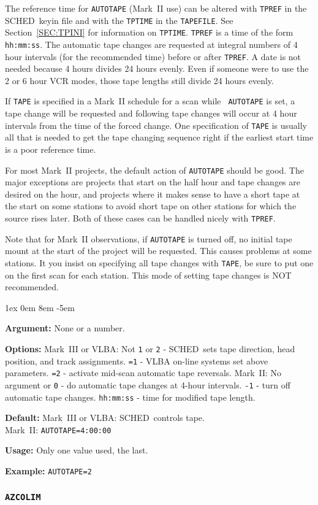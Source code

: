 \documentclass{report}
\newcommand{\schedb}{{\sc SCHED~}}
\newcommand{\rcwbox}[5]{
  \begin{list}{}{\parsep 1ex  \itemsep 0em
                 \leftmargin 8em  \itemindent -5em }
    \item {\bf Argument:} #1
    \item {\bf Options:}  #2
    \item {\bf Default:}  #3
    \item {\bf Usage:}    #4
    \item {\bf Example:}  #5
  \end{list}
}
\begin{document}
The reference time for {\tt AUTOTAPE} (Mark~II use) can be altered
with {\tt TPREF} in the \schedb keyin file and with the {\tt TPTIME}
in the {\tt TAPEFILE}. See Section~\ref{SEC:TPINI} for information on
{\tt TPTIME}. {\tt TPREF} is a time of the form {\tt hh:mm:ss}. The
automatic tape changes are requested at integral numbers of 4 hour
intervals (for the recommended time) before or after {\tt TPREF}. A
date is not needed because 4 hours divides 24 hours evenly. Even if
someone were to use the 2 or 6 hour VCR modes, those tape lengths
still divide 24 hours evenly.

If {\tt TAPE} is specified in a Mark~II schedule for a scan while {\tt
AUTOTAPE} is set, a tape change will be requested and following tape
changes will occur at 4 hour intervals from the time of the forced
change. One specification of {\tt TAPE} is usually all that is needed
to get the tape changing sequence right if the earliest start time is
a poor reference time.

For most Mark~II projects, the default action of {\tt AUTOTAPE} should
be good. The major exceptions are projects that start on the half hour
and tape changes are desired on the hour, and projects where it makes
sense to have a short tape at the start on some stations to avoid
short tape on other stations for which the source rises later. Both of
these cases can be handled nicely with {\tt TPREF}.

Note that for Mark~II observations, if {\tt AUTOTAPE} is turned off,
no initial tape mount at the start of the project will be requested.
This causes problems at some stations. It you insist on specifying all
tape changes with {\tt TAPE}, be sure to put one on the first scan for
each station. This mode of setting tape changes is NOT recommended.


\rcwbox
{None or a number.}
{Mark~III or VLBA: Not {\tt 1} or {\tt 2} - \schedb sets tape
direction, head position, and track assignments. {\tt =1} - VLBA
on-line systems set above parameters. {\tt =2} - activate mid-scan
automatic tape reversals. Mark~II: No argument or {\tt 0} - do
automatic tape changes at 4-hour intervals. {\tt -1} - turn off
automatic tape changes. {\tt hh:mm:ss} - time for modified tape
length.}
{Mark~III or VLBA: \schedb controls tape. \\
Mark~II: {\tt AUTOTAPE=4:00:00}}
{Only one value used, the last.}
{{\tt AUTOTAPE=2}}



\subsubsection{\label{MP:AZCOLIM}\tt AZCOLIM}
\end{document}
